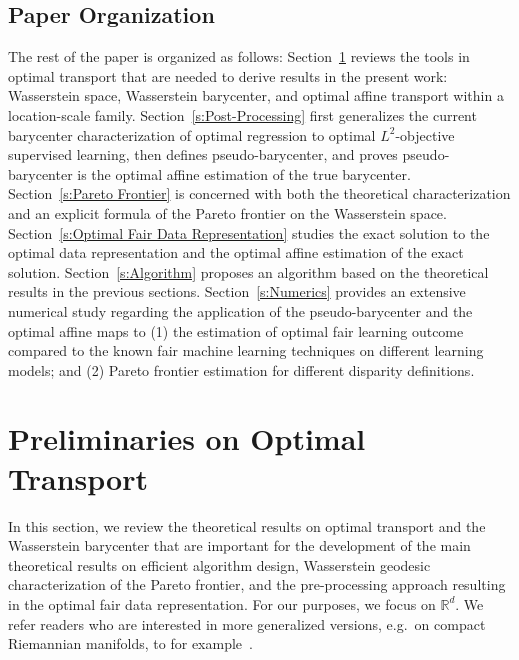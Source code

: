 \documentclass[twoside,11pt]{article}
\newcommand{\edit}[1]{\textcolor{blue}{#1}}
\begin{document}
\subsection{Paper Organization}

The rest of the paper is organized as follows: Section~\ref{S:Prelim} reviews the tools in optimal transport that are needed to derive results in the present work: Wasserstein space, Wasserstein barycenter, and optimal affine transport within a location-scale family. Section~\ref{s:Post-Processing} first generalizes the current barycenter characterization of optimal regression to optimal $L^2$-objective supervised learning, then defines pseudo-barycenter, and proves pseudo-barycenter is the optimal affine estimation of the true barycenter.  Section~\ref{s:Pareto Frontier} is concerned with both the theoretical characterization and an explicit formula of the Pareto frontier on the Wasserstein space. Section~\ref{s:Optimal Fair Data Representation} studies the exact solution to the optimal data representation and the optimal affine estimation of the exact solution. %
Section~\ref{s:Algorithm} proposes an algorithm based on the theoretical results in the previous sections. Section~\ref{s:Numerics} provides an extensive numerical study regarding the application of the pseudo-barycenter and the optimal affine maps to (1) the estimation of optimal fair learning outcome compared to the known fair machine learning techniques on different learning models; and (2) Pareto frontier estimation for different disparity definitions.  %


\section{Preliminaries on Optimal Transport} \label{S:Prelim}

In this section, we review the theoretical results on optimal transport and the Wasserstein barycenter that are important for the development of the main theoretical results on efficient algorithm design, Wasserstein geodesic characterization of the Pareto frontier, and the pre-processing approach resulting in the optimal fair data representation. For our purposes, we focus on $\mathbb{R}^d$. We refer readers who are interested in more generalized versions, e.g.\ on compact Riemannian manifolds, to for example~\cite{kim2017wasserstein}.
\end{document}
